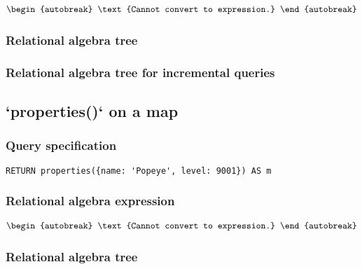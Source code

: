 \begin{align*}
\begin{autobreak}
\text{Cannot convert to expression.}
\end{autobreak}
\end{align*}

\subsubsection*{Relational algebra tree}


\subsubsection*{Relational algebra tree for incremental queries}


\subsection{`properties()` on a map}

\subsubsection*{Query specification}

\begin{lstlisting}
RETURN properties({name: 'Popeye', level: 9001}) AS m
\end{lstlisting}

\subsubsection*{Relational algebra expression}

\begin{align*}
\begin{autobreak}
\text{Cannot convert to expression.}
\end{autobreak}
\end{align*}

\subsubsection*{Relational algebra tree}


